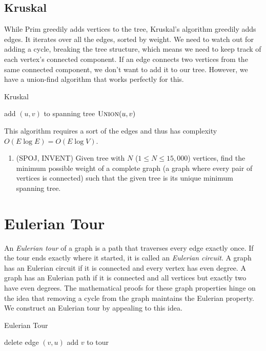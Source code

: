 \documentclass[11pt]{book}
\begin{document}
\subsection{Kruskal}

While Prim greedily adds vertices to the tree, Kruskal's algorithm greedily adds edges. It iterates over all the edges, sorted by weight. We need to watch out for adding a cycle, breaking the tree structure, which means we need to keep track of each vertex's connected component. If an edge connects two vertices from the same connected component, we don't want to add it to our tree. However, we have a union-find algorithm that works perfectly for this.

\begin{algorithm}[H]
\caption{Kruskal}
\begin{algorithmic}
		\State add $(u,v)$ to spanning tree
		\State $\Call{Union}{u,v}$
	\EndIf
\EndFor
\end{algorithmic}
\end{algorithm}

This algorithm requires a sort of the edges and thus has complexity $O(E \log{E}) = O(E \log{V})$.

\begin{enumerate}
\item
(SPOJ, INVENT)
Given tree with $N$ ($1 \le N \le 15,000$) vertices, find the minimum possible weight of a complete
graph (a graph where every pair of vertices is connected) such that the given tree is its unique minimum spanning
tree.
\end{enumerate}

\section{Eulerian Tour}

An \textit{Eulerian tour} of a graph is a path that traverses every edge exactly once. If the tour ends exactly where it started, it is called an \textit{Eulerian circuit}. A graph has an Eulerian circuit if it is connected and every vertex has even degree. A graph has an Eulerian path if it is connected and all vertices but exactly two have even degrees. The mathematical proofs for these graph properties hinge on the idea that removing a cycle from the graph maintains the Eulerian property. We construct an Eulerian tour by appealing to this idea.

\begin{algorithm}[H]
\caption{Eulerian Tour}
\begin{algorithmic}
	\State delete edge $(v,u)$
	\State {}
\EndWhile
\State add $v$ to tour
\EndFunction
\end{algorithmic}
\end{algorithm}
\end{document}
